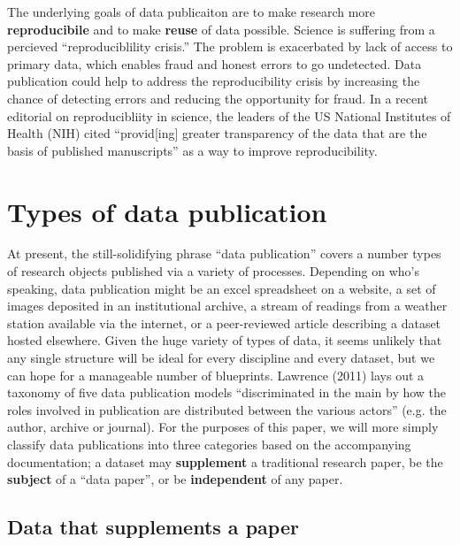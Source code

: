 \documentclass[10pt,twocolumn]{article}
\begin{document}
The underlying goals of data publicaiton are to make research more \textbf{reproducibile} and to make \textbf{reuse} of data possible.
Science is suffering from a percieved ``reproduciblility crisis.''\cite{mobley_survey_2013,pashler_is_2012,zimmer_rise_2012,hiltzik_science_2013,begley_drug_2012}
The problem is exacerbated by lack of access to primary data, which enables fraud and honest errors to go undetected.
Data publication could help to address the reproducibility crisis by increasing the chance of detecting errors and reducing the opportunity for fraud.\cite{drew_lost_2013}
In a recent editorial on reproducibliity in science, the leaders of the US National Institutes of Health (NIH) cited ``provid[ing] greater transparency of the data that are the basis of published manuscripts'' as a way to improve reproducibility.\cite{collins_nih_2014}



\section*{Types of data publication}\label{types-of-data-publication}

At present, the still-solidifying phrase ``data publication'' covers a number types of research objects published via a variety of processes.
Depending on who's speaking,  data publication might be an excel spreadsheet on a website, a set of images deposited in an institutional archive, a stream of readings from a weather station available via the internet, or a peer-reviewed article describing a dataset hosted elsewhere.
Given the huge variety of types of data, it seems unlikely that any single structure will be ideal for every discipline and every dataset, but we can hope for a manageable number of blueprints. 
Lawrence (2011) lays out a taxonomy of five data publication models ``discriminated in the main by how the roles involved in publication are distributed between the various actors'' (e.g. the author, archive or journal).\cite{lawrence_data_2011}
For the purposes of this paper, we will more simply classify data publications into three categories based on the accompanying documentation; a dataset may \textbf{supplement} a traditional research paper, be the \textbf{subject} of a ``data paper'', or be \textbf{independent} of any paper.


\subsection*{Data that supplements a paper}\label{paper-supplement-data}
\end{document}
